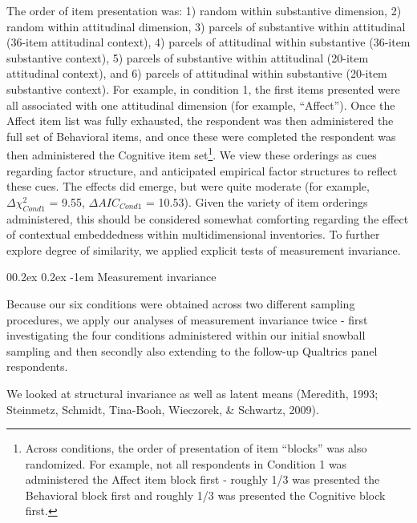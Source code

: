\documentclass[
  man]{apa6}
\makeatletter
\let\oldparagraph\paragraph
\renewcommand{\paragraph}[1]{\oldparagraph{#1}\mbox{}}
\renewcommand{\paragraph}{\@startsection{paragraph}{4}{\parindent}%
  {0\baselineskip \@plus 0.2ex \@minus 0.2ex}%
  {-1em}%
  {\normalfont\normalsize\bfseries\itshape\typesectitle}}
\makeatother
\begin{document}
The order of item presentation was: 1) random within substantive dimension, 2) random within attitudinal dimension, 3) parcels of substantive within attitudinal (36-item attitudinal context), 4) parcels of attitudinal within substantive (36-item substantive context), 5) parcels of substantive within attitudinal (20-item attitudinal context), and 6) parcels of attitudinal within substantive (20-item substantive context). For example, in condition 1, the first items presented were all associated with one attitudinal dimension (for example, ``Affect''). Once the Affect item list was fully exhausted, the respondent was then administered the full set of Behavioral items, and once these were completed the respondent was then administered the Cognitive item set\footnote{Across conditions, the order of presentation of item ``blocks'' was also randomized. For example, not all respondents in Condition 1 was administered the Affect item block first - roughly 1/3 was presented the Behavioral block first and roughly 1/3 was presented the Cognitive block first.}. We view these orderings as cues regarding factor structure, and anticipated empirical factor structures to reflect these cues. The effects did emerge, but were quite moderate (for example, \(\Delta{\chi^2_{Cond1}}\) = 9.55, \(\Delta{AIC_{Cond1}}\) = 10.53). Given the variety of item orderings administered, this should be considered somewhat comforting regarding the effect of contextual embeddedness within multidimensional inventories. To further explore degree of similarity, we applied explicit tests of measurement invariance.

\hypertarget{measurement-invariance}{%
\paragraph{Measurement invariance}\label{measurement-invariance}}

Because our six conditions were obtained across two different sampling procedures, we apply our analyses of measurement invariance twice - first investigating the four conditions administered within our initial snowball sampling and then secondly also extending to the follow-up Qualtrics panel respondents.

We looked at structural invariance as well as latent means (Meredith, 1993; Steinmetz, Schmidt, Tina-Booh, Wieczorek, \& Schwartz, 2009).
\end{document}
